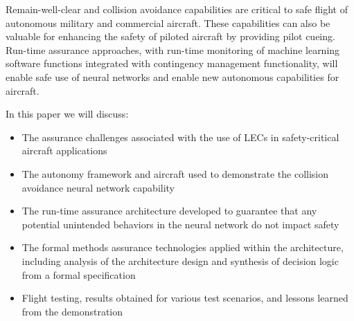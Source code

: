 Remain-well-clear and collision avoidance capabilities are critical to safe flight of autonomous
military and commercial aircraft. These capabilities can also be valuable for
enhancing the safety of piloted aircraft by providing pilot cueing. Run-time assurance
approaches, with run-time monitoring of machine learning software functions integrated with
contingency management functionality, will enable safe use of neural networks and enable new
autonomous capabilities for aircraft.

In this paper we will discuss: 
\begin{itemize} 
\item The assurance challenges associated with the use of LECs in safety-critical aircraft applications 
\item The autonomy framework and aircraft used to demonstrate the collision avoidance neural network capability 
\item The run-time assurance architecture developed to guarantee that any potential unintended behaviors in the neural network do not impact safety
\item The formal methods assurance technologies applied within the architecture, including analysis of the architecture design and synthesis of decision logic from a formal specification
\item Flight testing, results obtained for various test scenarios, and lessons learned from the
demonstration
\end{itemize}
